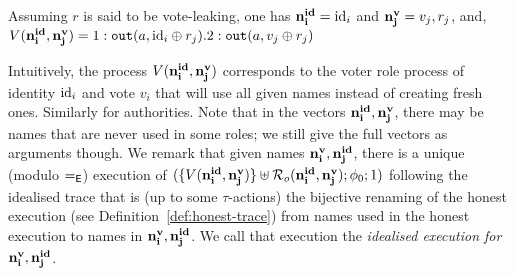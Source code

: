 \begin{example}
  \label{ex:leaking-names-two}
  Assuming $r$ is said to be vote-leaking, one has ${\mathbf{n^{id}_{i}}}=\mathrm{id}_i$ and
  ${\mathbf{n^{v}_{j}}}=v_j,r_j$, and,
  $V({\mathbf{n^{id}_{i}}},{\mathbf{n^{v}_{j}}})= 1: \mathtt{out}(a, \mathrm{id}_i\oplus r_j).2: \mathtt{out}(a, v_j\oplus r_j)$
\end{example}

Intuitively, the process $V({\mathbf{n^{id}_{i}}},{\mathbf{n^{v}_{j}}})$ corresponds to the voter role process of identity $\mathrm{id}_i$ and vote
$v_i$ that will use all given names instead of creating fresh ones.
Similarly for authorities.
Note that in the vectors ${\mathbf{n^{id}_{i}}},{\mathbf{n^{v}_{j}}}$,
there may be names that are never used in some roles;
we still give the full vectors as arguments though.
%
%
We remark that given names ${\mathbf{n^{v}_{i}}},{\mathbf{n^{id}_{j}}}$, there is a unique (modulo $=_{\mathsf{E}}$) execution of
$(\{V({\mathbf{n^{id}_{i}}},{\mathbf{n^{v}_{j}}})\}\uplus\mathcal{R}_o({\mathbf{n^{id}_{i}}},{\mathbf{n^{v}_{j}}});\phi_0;1)$
following the idealised trace that is
(up to some $\tau$-actions) the bijective renaming of the honest execution (see Definition~\ref{def:honest-trace})
from names used in the honest execution to names in ${\mathbf{n^{v}_{i}}},{\mathbf{n^{id}_{j}}}$.
We call that execution the {\em idealised execution for ${\mathbf{n^{v}_{i}}},{\mathbf{n^{id}_{j}}}$}.



